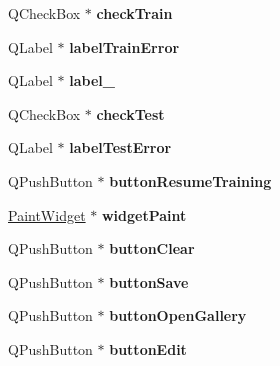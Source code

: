 \begin{DoxyCompactItemize}
Q\+Check\+Box $\ast$ {\bfseries check\+Train}
\item 
\mbox{\label{class_ui___main_form_a106c0331768b3461349a6efbd54fb892}} 
Q\+Label $\ast$ {\bfseries label\+Train\+Error}
\item 
\mbox{\label{class_ui___main_form_a9f4b4c2c429e6f03bc92f3491a8c1ac4}} 
Q\+Label $\ast$ {\bfseries label\+\_}
\item 
\mbox{\label{class_ui___main_form_a5032eb60ec8b62807f8e9672eefb2b9a}} 
Q\+Check\+Box $\ast$ {\bfseries check\+Test}
\item 
\mbox{\label{class_ui___main_form_a4965ef73682aa61a7830b11c31110bf0}} 
Q\+Label $\ast$ {\bfseries label\+Test\+Error}
\item 
\mbox{\label{class_ui___main_form_a505e9c42db668bdfc2a4c90fc74d66ef}} 
Q\+Push\+Button $\ast$ {\bfseries button\+Resume\+Training}
\item 
\mbox{\label{class_ui___main_form_ad5f21f92ee175af2cb2251313e0f8441}} 
\hyperlink{class_paint_widget}{Paint\+Widget} $\ast$ {\bfseries widget\+Paint}
\item 
\mbox{\label{class_ui___main_form_a130b577aef64272cdd63fe4ded47c553}} 
Q\+Push\+Button $\ast$ {\bfseries button\+Clear}
\item 
\mbox{\label{class_ui___main_form_a8aa11edd7d2a9402c7a5d56f473157fd}} 
Q\+Push\+Button $\ast$ {\bfseries button\+Save}
\item 
\mbox{\label{class_ui___main_form_a953bf473c15c8703bae3e779d9b75e23}} 
Q\+Push\+Button $\ast$ {\bfseries button\+Open\+Gallery}
\item 
\mbox{\label{class_ui___main_form_a7a66f0fc30f4ac5ae2ad03c9b9eb0726}} 
Q\+Push\+Button $\ast$ {\bfseries button\+Edit}
\item 
\mbox{\label{class_ui___main_form_a1d8cd63247863156083819f2cfd18ce1}} 

\end{DoxyCompactItemize}
